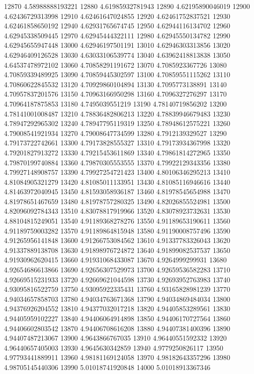 {12870 4.58988888193221
12880 4.61985932781943
12890 4.62195890046019
12900 4.62436729313998
12910 4.62461647024855
12920 4.62461752837521
12930 4.62461858650192
12940 4.62931765674745
12950 4.62944116134702
12960 4.62945338509445
12970 4.62945444322111
12980 4.62945550134782
12990 4.62945655947448
13000 4.62946197501191
13010 4.62946303313856
13020 4.62946409126528
13030 4.63033106539774
13040 4.63962418813838
13050 4.64537478972102
13060 4.70858291191672
13070 4.7085923367726
13080 4.70859339489925
13090 4.70859445302597
13100 4.70859551115262
13110 4.70860622845532
13120 4.70929860104894
13130 4.7095773138891
13140 4.70957837201576
13150 4.70963166950298
13160 4.7096327276297
13170 4.70964187875853
13180 4.7495039551219
13190 4.78140719856202
13200 4.78141001008487
13210 4.78836482806213
13220 4.78839946679483
13230 4.78947292965302
13240 4.78947795119319
13250 4.78948612575221
13260 4.79008541921934
13270 4.79008647734599
13280 4.7912139329527
13290 4.79173722742661
13300 4.79173828555327
13310 4.79173934367998
13320 4.79201827913272
13330 4.79215453611869
13340 4.79861814272965
13350 4.79870199740884
13360 4.79870305553555
13370 4.79922129343356
13380 4.79927148908757
13390 4.79927254721423
13400 4.80106346295213
13410 4.81084905321279
13420 4.81085011133951
13430 4.81085116946616
13440 4.81463972040945
13450 4.81593058936187
13460 4.81978545654988
13470 4.81978651467659
13480 4.81978757280325
13490 4.82026855524981
13500 4.82096092784343
13510 4.83078817919966
13520 4.83078923732631
13530 4.88104815249051
13540 4.91189368278276
13550 4.91189653190611
13560 4.91189759003282
13570 4.91189864815948
13580 4.91190008757496
13590 4.91265956141848
13600 4.91266753084562
13610 4.91337783326043
13620 4.91337889138708
13630 4.91898976724872
13640 4.91899082537537
13650 4.91930962620415
13660 4.91931068433087
13670 4.9264999299931
13680 4.92654686613866
13690 4.92656307529973
13700 4.92659536582283
13710 4.92669515231933
13720 4.92669621044598
13730 4.92693952763983
13740 4.93095816522759
13750 4.93095922335431
13760 4.93165828981239
13770 4.94034657858703
13780 4.94034763671368
13790 4.94034869484034
13800 4.94376926204552
13810 4.94377032017218
13820 4.94405853289561
13830 4.94405959102227
13840 4.94406064914898
13850 4.94406170727564
13860 4.94406602803542
13870 4.94406708616208
13880 4.94407381400396
13890 4.94407487213067
13900 4.9643866767035
13910 4.96440551592332
13920 4.96440657405003
13930 4.9645630342859
13940 4.9779250826117
13950 4.97793441889911
13960 4.98181169124058
13970 4.98182643357296
13980 4.98705145440306
13990 5.01018741920848
14000 5.01018913367346
}
